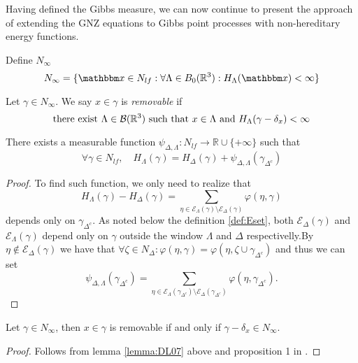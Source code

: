 Having defined the Gibbs measure, we can now continue to present the approach of \cite{DereudreLavancier2007} extending the GNZ equations to Gibbs point processes with non-hereditary energy functions.

Define $N_\infty$
$$N_\infty = \{\x \in N_{lf}: \forall \Lambda \in B_0(\Rt): H_\Lambda(\x)< \infty\}$$

\begin{definition}
	Let $\gamma \in N_\infty$. We say $x\in\gamma$ is \textit{removable} if 
	$$\text{there exist } \Lambda \in \mathcal B({\mathbb R^3}) \text{ such that } x\in\Lambda \text{ and } H_\Lambda(\gamma - \delta_x)<\infty$$
\end{definition}


\begin{lemma}\label{lemma:DL07}
	There exists a measurable function $\psi_{\Delta,\Lambda}:N_{lf}\to \mathbb R\cup\{+\infty\}$ such that
	$$\forall \gamma \in N_{lf},\quad H_\Lambda(\gamma) = H_\Delta(\gamma) + \psi_{\Delta,\Lambda}(\gamma_{\Delta^c})$$
\end{lemma}
\begin{proof}
	To find such function, we only need to realize that
	$$H_\Lambda(\gamma) - H_\Delta(\gamma) = \sum_{\eta \in \mathcal E_\Lambda(\gamma) \setminus \mathcal E_\Delta(\gamma)} \varphi(\eta,\gamma)$$
	depends only on $\gamma_{\Delta^c}$. As noted below the definition \ref{def:Eset}, both $\mathcal E_\Delta(\gamma)$ and $\mathcal E_\Lambda(\gamma)$ depend only on $\gamma$ outside the window $\Lambda$ and $\Delta$ respectivelly.By $\eta \notin \mathcal E_{\Delta}(\gamma)$ we have that $\forall \zeta \in N_\Delta: \varphi(\eta,\gamma)=\varphi(\eta,\zeta \cup \gamma_{\Delta^c})$ and thus we can set
	$$\psi_{\Delta,\Lambda}(\gamma_{\Delta^c}) = \sum_{\eta \in \mathcal E_\Lambda(\gamma_{\Delta^c}) \setminus \mathcal E_\Delta(\gamma_{\Delta^c})} \varphi(\eta,\gamma_{\Delta^c}).$$
\end{proof}



\begin{proposition}
	Let $\gamma \in N_\infty$, then $x\in\gamma$ is removable if and only if $\gamma - \delta_x \in N_\infty$.
\end{proposition}
\begin{proof}
	Follows from lemma \ref{lemma:DL07} above and proposition 1 in \cite{DereudreLavancier2007}.	
\end{proof}


